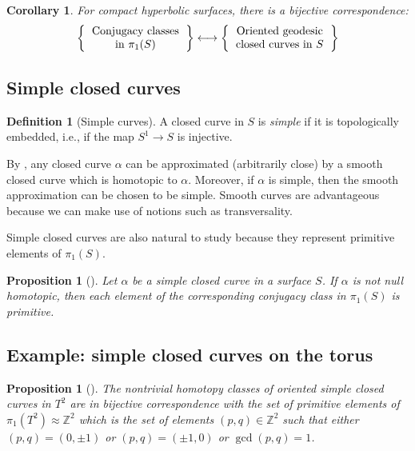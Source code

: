 \documentclass[reqno]{amsart}
\newtheorem{proposition}[theorem]{Proposition}
\newtheorem{corollary}[theorem]{Corollary}
\theoremstyle{definition}
\newtheorem{definition}[theorem]{Definition}
\theoremstyle{remark}
\begin{document}
 \begin{corollary}
     For compact hyperbolic surfaces, 
     there is a bijective correspondence:
\[
\left\{ 
    \begin{tabular}{c}
        Conjugacy classes\\
        in $\pi_1 (S)$
\end{tabular}
\right\} 
\longleftrightarrow
\left\{ 
    \begin{tabular}{c}
        Oriented geodesic\\
        closed curves in $S$
\end{tabular}
\right\} 
\] 
 \end{corollary}

 \subsection*{Simple closed curves}
 
\begin{definition}[Simple curves]
    A closed curve in $S$ is \textit{simple} if it is topologically embedded, i.e.,
    if the map $S^{1} \to S$ is injective.  
\end{definition}

By \cite[Thm~11.8]{Bredon}, any closed curve $\alpha$ can be approximated 
(arbitrarily close) by
a smooth closed curve which is homotopic to $\alpha$. Moreover,
if $\alpha$ is simple, then the smooth approximation can be chosen to be
simple. Smooth curves are advantageous because we can make use of notions
such as transversality.

Simple closed curves are also natural to study because they represent
primitive elements of $\pi_1 (S)$.

\begin{proposition}[]
    Let $\alpha$ be a simple closed curve in a surface $S$. If $\alpha$ 
    is not null homotopic, then each element of the corresponding conjugacy
    class in $\pi_1(S)$ is primitive.
\end{proposition}

\subsection*{Example: simple closed curves on the torus}

\begin{proposition}[]
    The nontrivial homotopy classes of oriented simple closed
    curves in $T^2$ are in bijective correspondence with the set of primitive
    elements of $\pi_1\left( T^2 \right) \approx \mathbb{Z}^2$ which is
    the set of elements $\left( p,q \right)  \in \mathbb{Z}^2$ such that
    either $(p,q) = (0,\pm 1)$ or  $(p,q) = (\pm 1,0)$ or
     $\gcd(p,q) = 1$.
\end{proposition}
\end{document}
